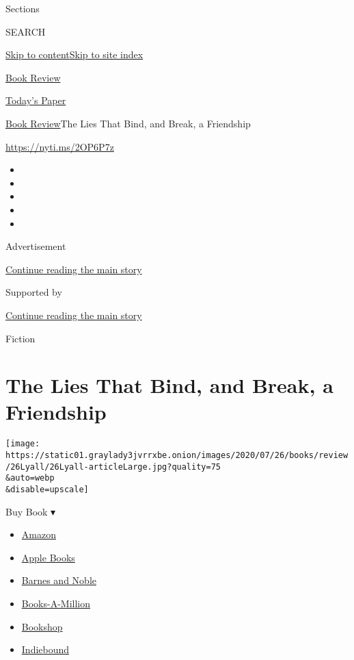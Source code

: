 Sections

SEARCH

\protect\hyperlink{site-content}{Skip to
content}\protect\hyperlink{site-index}{Skip to site index}

\href{https://www.nytimes3xbfgragh.onion/section/books/review}{Book
Review}

\href{https://myaccount.nytimes3xbfgragh.onion/auth/login?response_type=cookie\&client_id=vi}{}

\href{https://www.nytimes3xbfgragh.onion/section/todayspaper}{Today's
Paper}

\href{/section/books/review}{Book Review}\textbar{}The Lies That Bind,
and Break, a Friendship

\url{https://nyti.ms/2OP6P7z}

\begin{itemize}
\item
\item
\item
\item
\item
\end{itemize}

Advertisement

\protect\hyperlink{after-top}{Continue reading the main story}

Supported by

\protect\hyperlink{after-sponsor}{Continue reading the main story}

Fiction

\hypertarget{the-lies-that-bind-and-break-a-friendship}{%
\section{The Lies That Bind, and Break, a
Friendship}\label{the-lies-that-bind-and-break-a-friendship}}

\texttt{[image: https://static01.graylady3jvrrxbe.onion/images/2020/07/26/books/review/26Lyall/26Lyall-articleLarge.jpg?quality=75\\\&auto=webp\\\&disable=upscale]}

Buy Book ▾

\begin{itemize}
\tightlist
\item
  \href{https://www.amazon.com/gp/search?index=books\&tag=NYTBSREV-20\&field-keywords=Imperfect+Women+Araminta+Hall}{Amazon}
\item
  \href{https://du-gae-books-dot-nyt-du-prd.appspot.com/buy?title=Imperfect+Women\&author=Araminta+Hall}{Apple
  Books}
\item
  \href{https://www.anrdoezrs.net/click-7990613-11819508?url=https\%3A\%2F\%2Fwww.barnesandnoble.com\%2Fw\%2F\%3Fean\%3D9780374272586}{Barnes
  and Noble}
\item
  \href{https://www.anrdoezrs.net/click-7990613-35140?url=https\%3A\%2F\%2Fwww.booksamillion.com\%2Fp\%2FImperfect\%2BWomen\%2FAraminta\%2BHall\%2F9780374272586}{Books-A-Million}
\item
  \href{https://bookshop.org/a/3546/9780374272586}{Bookshop}
\item
  \href{https://www.indiebound.org/book/9780374272586?aff=NYT}{Indiebound}
\end{itemize}

